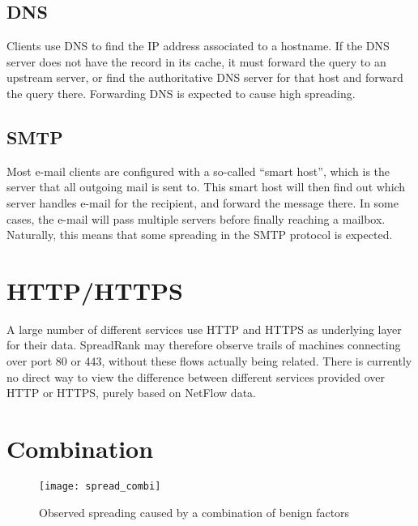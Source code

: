 \subsection{DNS}
Clients use DNS to find the IP address associated to a hostname.
If the DNS server does not have the record in its cache,
 it must forward the query to an upstream server,
 or find the authoritative DNS server for that host and forward the query there.
Forwarding DNS is expected to cause high spreading.


\subsection{SMTP}
Most e-mail clients are configured with a so-called ``smart host'',
 which is the server that all outgoing mail is sent to.
This smart host will then find out which server handles e-mail for the recipient, and forward the message there.
In some cases, the e-mail will pass multiple servers before finally reaching a mailbox.
Naturally, this means that some spreading in the SMTP protocol is expected.


\section{HTTP/HTTPS}
\label{sec:http}
A large number of different services use HTTP and HTTPS as underlying layer for their data.
SpreadRank may therefore observe trails of machines connecting over port 80 or 443,
 without these flows actually being related.
There is currently no direct way to view the difference between different services provided over HTTP or HTTPS, purely based on NetFlow data.



\section{Combination}
\begin{figure}[h!]
	\caption{Observed spreading caused by a combination of benign factors}
	\label{fig:spread_combi}
	\centering
		\texttt{[image: spread\_combi]}
\end{figure}

